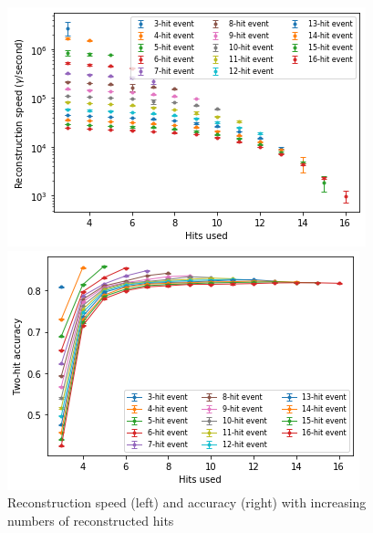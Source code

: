 \begin{figure}
    \centering
    \begin{minipage}{0.49\textwidth} \centering
        \includegraphics[width=\textwidth]{graphs/pi_hits_v_hitsUsed_speed.png}
        \end{minipage}
        \begin{minipage}{0.49\textwidth} \centering
        \includegraphics[width=\textwidth]{graphs/pi_hits_v_hitsUsed_accuracy.png}
        \end{minipage}
        \caption{Reconstruction speed (left) and accuracy (right) with increasing numbers of reconstructed hits}
        \label{fig:hits_v_hitsUsed}
\end{figure}

